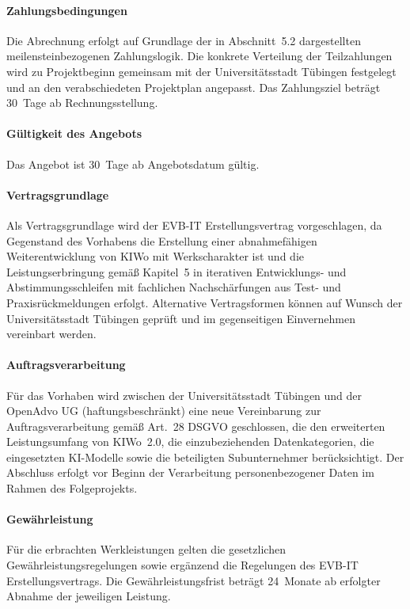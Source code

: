 \documentclass[11pt,a4paper,openany]{report}
\let\origparagraph\paragraph
\renewcommand{\paragraph}[1]{\needspace{4\baselineskip}\origparagraph{#1}}
\begin{document}
\paragraph{Zahlungsbedingungen}
Die Abrechnung erfolgt auf Grundlage der in Abschnitt~5.2 dargestellten
meilensteinbezogenen Zahlungslogik. Die konkrete Verteilung der
Teilzahlungen wird zu Projektbeginn gemeinsam mit der Universitätsstadt
Tübingen festgelegt und an den verabschiedeten Projektplan angepasst.
Das Zahlungsziel beträgt 30~Tage ab Rechnungsstellung.

\paragraph{Gültigkeit des Angebots}
Das Angebot ist 30~Tage ab Angebotsdatum gültig.

\paragraph{Vertragsgrundlage}
Als Vertragsgrundlage wird der EVB-IT Erstellungsvertrag
vorgeschlagen, da Gegenstand des Vorhabens die Erstellung einer
abnahmefähigen Weiterentwicklung von KIWo mit Werkscharakter ist und die
Leistungserbringung gemäß Kapitel~5 in iterativen Entwicklungs- und
Abstimmungsschleifen mit fachlichen Nachschärfungen aus Test- und
Praxisrückmeldungen erfolgt. Alternative Vertragsformen können auf
Wunsch der Universitätsstadt Tübingen geprüft und im gegenseitigen
Einvernehmen vereinbart werden.

\paragraph{Auftragsverarbeitung}
Für das Vorhaben wird zwischen der Universitätsstadt Tübingen und
der OpenAdvo UG (haftungsbeschränkt) eine neue Vereinbarung zur
Auftragsverarbeitung gemäß Art.~28 DSGVO geschlossen, die den
erweiterten Leistungsumfang von KIWo~2.0, die einzubeziehenden
Datenkategorien, die eingesetzten KI-Modelle sowie die beteiligten
Subunternehmer berücksichtigt. Der Abschluss erfolgt vor Beginn der
Verarbeitung personenbezogener Daten im Rahmen des Folgeprojekts.

\paragraph{Gewährleistung}
Für die erbrachten Werkleistungen gelten die gesetzlichen
Gewährleistungsregelungen sowie ergänzend die Regelungen des EVB-IT
Erstellungsvertrags. Die Gewährleistungsfrist beträgt 24~Monate
ab erfolgter Abnahme der jeweiligen Leistung.
\end{document}
